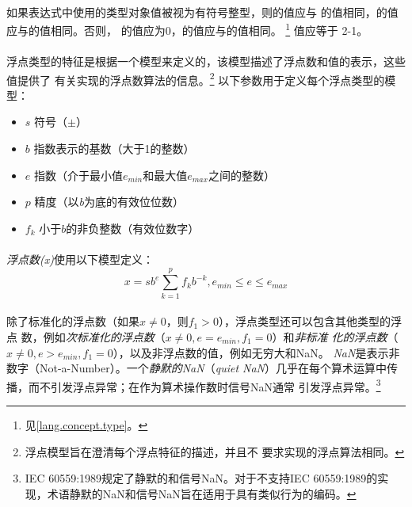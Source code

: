 \paragraph{}
如果表达式中使用的类型对象值被视为有符号整型，则的值应与
的值相同，的值应与的值相同。否则，
的值应为0，的值应与的值相同。
\footnote{见\ref{lang.concept.type}。} 值应等于
2-1。


\paragraph{}
浮点类型的特征是根据一个模型来定义的，该模型描述了浮点数和值的表示，这些值提供了
有关实现的浮点数算法的信息。\footnote{浮点模型旨在澄清每个浮点特征的描述，并且不
要求实现的浮点算法相同。} 以下参数用于定义每个浮点类型的模型：
\begin{itemize}
  \item[]{$s$   \qquad 符号（$\pm$）}
  \item[]{$b$   \qquad 指数表示的基数（大于1的整数）}
  \item[]{$e$   \qquad 指数（介于最小值$e_{min}$和最大值$e_{max}$之间的整数）}
  \item[]{$p$   \qquad 精度（以\textit{b}为底的有效位位数）}
  \item[]{$f_k$ \qquad 小于$b$的非负整数（有效位数字）}
\end{itemize}

\paragraph{}
\textit{浮点数(x)}使用以下模型定义：
\begin{equation*}
  x = sb^e\sum_{k=1}^p f_k b^{-k}, e_{min} \le e \le e_{max}
\end{equation*}

\paragraph{}
除了标准化的浮点数（如果$x\neq0$，则$f_1>0$），浮点类型还可以包含其他类型的浮点
数，例如\textit{次标准化的浮点数}（$x\neq0,e=e_{min},f_1=0$）和\textit{非标准
化的浮点数}（$x\neq0,e>e_{min},f_1=0$），以及非浮点数的值，例如无穷大和NaN。
\textit{NaN}是表示非数字（Not-a-Number）。一个\textit{静默的NaN}（\textit{quiet
NaN}）几乎在每个算术运算中传播，而不引发浮点异常；在作为算术操作数时信号NaN通常
引发浮点异常。\footnote{IEC 60559:1989规定了静默的和信号NaN。对于不支持IEC
60559:1989的实现，术语静默的NaN和信号NaN旨在适用于具有类似行为的编码。}

